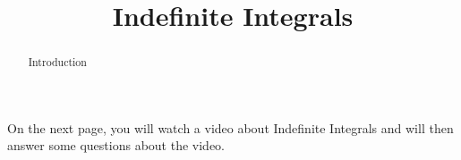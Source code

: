 \documentclass[handout]{ximera}
\title{Indefinite Integrals}
\begin{document}
\begin{abstract} Introduction %
\end{abstract}

\maketitle

On the next page, you will watch a video about Indefinite Integrals and will then answer some questions about the video.
\end{document}
